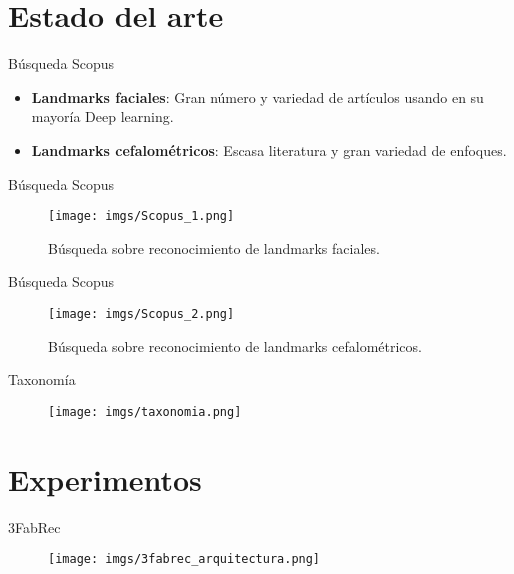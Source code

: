 \documentclass[aspectratio=43]{beamer}
\begin{document}
\section{Estado del arte}

\begin{frame}{Búsqueda Scopus}
  \begin{itemize}
    \item \textbf{Landmarks faciales}: Gran número y variedad de artículos usando en su mayoría Deep learning.
    \item \textbf{Landmarks cefalométricos}: Escasa literatura y gran variedad de enfoques.
  \end{itemize}
\end{frame}

\begin{frame}{Búsqueda Scopus}
  \begin{figure}
    \centering
    \texttt{[image: imgs/Scopus\_1.png]}
    \caption{Búsqueda sobre reconocimiento de landmarks faciales.}
  \end{figure}
\end{frame}

\begin{frame}{Búsqueda Scopus}
  \begin{figure}
    \centering
    \texttt{[image: imgs/Scopus\_2.png]}
    \caption{Búsqueda sobre reconocimiento de landmarks cefalométricos.}
  \end{figure}
\end{frame}

\begin{frame}{Taxonomía}
  \begin{figure}
    \centering
    \texttt{[image: imgs/taxonomia.png]}
  \end{figure}
\end{frame}

\section{Experimentos}

\begin{frame}{3FabRec}
  \begin{figure}
    \centering
    \texttt{[image: imgs/3fabrec\_arquitectura.png]}
  \end{figure}
\end{frame}
\end{document}
